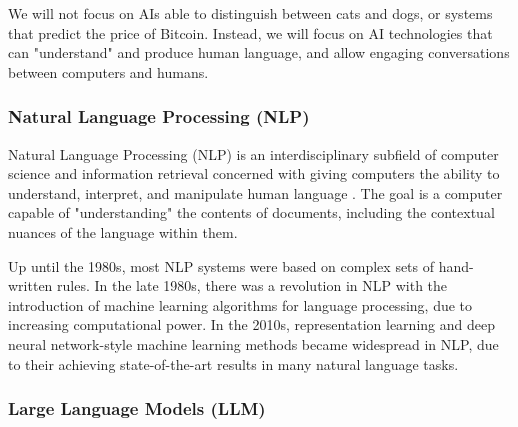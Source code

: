 \documentclass{article}
\begin{document}
We will not focus on AIs able to distinguish between cats and dogs, or systems that predict the price of Bitcoin. Instead, we will focus on AI technologies that can "understand" and produce human language, and allow engaging conversations between computers and humans.


\subsubsection{Natural Language Processing (NLP)}

Natural Language Processing (NLP) is an interdisciplinary subfield
of computer science and information retrieval concerned with giving
computers the ability to understand, interpret, and manipulate human
language . The goal is a computer capable of "understanding"
the contents of documents, including the contextual nuances of the
language within them.

Up until the 1980s, most NLP systems were based on complex sets of
hand-written rules. In the late 1980s, there was a revolution in NLP with
the introduction of machine learning algorithms for language processing,
due to increasing computational power. In the 2010s, representation learning
and deep neural network-style machine learning methods became widespread in
NLP, due to their achieving state-of-the-art results in many natural language
tasks.


\subsubsection{Large Language Models (LLM)}

\end{document}
